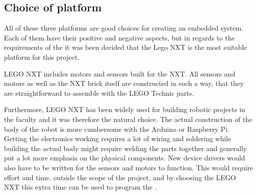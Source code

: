 \subsection{Choice of platform}
All of these three platforms are good choices for creating an embedded system. Each of them have their positive and negative aspects, but in regards to the requirements of the \projname{} it was been decided that the Lego NXT is the most suitable platform for this project.

LEGO NXT includes motors and sensors built for the NXT. All sensors and motors as well as the NXT brick itself are constructed in such a way, that they are straightforward to assemble with the LEGO Technic parts. 

Furthermore, LEGO NXT has been widely used for building robotic projects in the faculty and it was therefore the natural choice. The actual construction of the body of the robot is more cumbersome with the Arduino or Raspberry Pi. Getting the electronics working requires a lot of wiring and soldering while building the actual body might require welding the parts together and generally put a lot more emphasis on the physical components. New device drivers would also have to be written for the sensors and motors to function. This would require effort and time, outside the scope of the project, and by choosing the LEGO NXT this extra time can be used to program the \projname{}.



